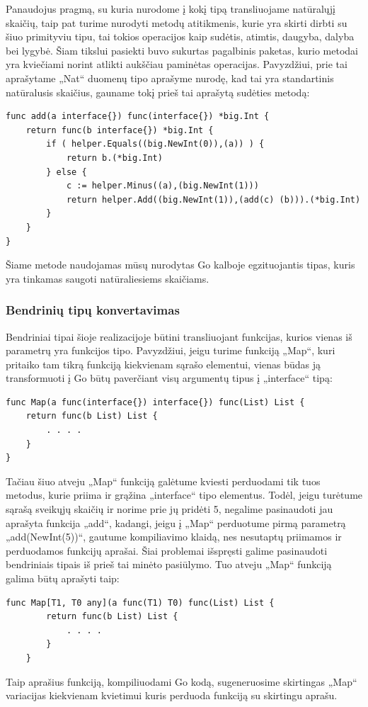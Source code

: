 \documentclass{VUMIFPSkursinis}
\begin{document}
\par Panaudojus pragmą, su kuria nurodome į kokį tipą transliuojame natūralųjį skaičių, taip pat turime nurodyti metodų atitikmenis, kurie yra skirti dirbti su šiuo primityviu tipu, tai tokios operacijos kaip sudėtis, atimtis, daugyba, dalyba bei lygybė. Šiam tikslui pasiekti buvo sukurtas pagalbinis paketas, kurio metodai yra kviečiami norint atlikti aukščiau paminėtas operacijas. Pavyzdžiui, prie tai aprašytame „Nat“ duomenų tipo aprašyme nurodę, kad tai yra standartinis natūralusis skaičius, gauname tokį prieš tai aprašytą sudėties metodą:
\begin{lstlisting}[language=GoCust]
func add(a interface{}) func(interface{}) *big.Int {
	return func(b interface{}) *big.Int {
 		if ( helper.Equals((big.NewInt(0)),(a)) ) {
 			return b.(*big.Int) 
		} else {
 			c := helper.Minus((a),(big.NewInt(1))) 
 			return helper.Add((big.NewInt(1)),(add(c) (b))).(*big.Int) 
		}
 	}
}
\end{lstlisting}
Šiame metode naudojamas mūsų nurodytas Go kalboje egzituojantis tipas, kuris yra tinkamas saugoti natūraliesiems skaičiams.
\subsubsection{Bendrinių tipų konvertavimas}
Bendriniai tipai šioje realizacijoje būtini transliuojant funkcijas, kurios vienas iš parametrų yra funkcijos tipo. Pavyzdžiui, jeigu turime funkciją „Map“, kuri pritaiko tam tikrą funkciją kiekvienam sąrašo elementui, vienas būdas ją transformuoti į Go būtų paverčiant visų argumentų tipus į „interface{}“ tipą:
\begin{lstlisting}[language=GoCust]
func Map(a func(interface{}) interface{}) func(List) List {
	return func(b List) List {
		. . . .
	}
}
\end{lstlisting}
Tačiau šiuo atveju „Map“ funkciją galėtume kviesti perduodami tik tuos metodus, kurie priima ir grąžina „interface{}“ tipo elementus. Todėl, jeigu turėtume sąrašą sveikųjų skaičių ir norime prie jų pridėti 5, negalime pasinaudoti jau aprašyta funkcija „add“, kadangi, jeigu į „Map“ perduotume pirmą parametrą „add(NewInt(5))“, gautume kompiliavimo klaidą, nes nesutaptų priimamos ir perduodamos funkcijų aprašai. Šiai problemai išspręsti galime pasinaudoti bendriniais tipais iš prieš tai minėto pasiūlymo. Tuo atveju „Map“ funkciją galima būtų aprašyti taip:
\begin{lstlisting}[language=GoCust]
	func Map[T1, T0 any](a func(T1) T0) func(List) List {
		return func(b List) List {
			. . . .
		}
	}
	\end{lstlisting}
Taip aprašius funkciją, kompiliuodami Go kodą, sugeneruosime skirtingas „Map“ variacijas kiekvienam kvietimui kuris perduoda funkciją su skirtingu aprašu.
\end{document}
